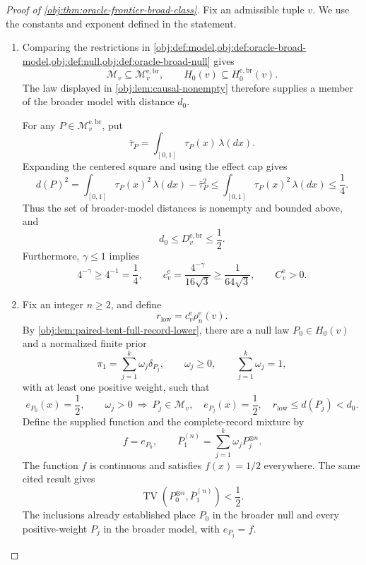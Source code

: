 \documentclass[11pt]{article}
\begin{document}
\begin{proof}[Proof of \cref{obj:thm:oracle-frontier-broad-class}]
Fix an admissible tuple \(v\). We use the constants and exponent defined in the statement.

\begin{enumerate}
\item Comparing the restrictions in
\cref{obj:def:model,obj:def:oracle-broad-model,obj:def:null,obj:def:oracle-broad-null}
gives
\[
\mathcal M_v\subseteq\mathcal M_v^{\mathrm{e,br}},
\qquad
H_0(v)\subseteq H_0^{\mathrm{e,br}}(v).
\]
The law displayed in \cref{obj:lem:causal-nonempty} therefore supplies a member of the broader model with distance \(d_0\).

For any \(P\in\mathcal M_v^{\mathrm{e,br}}\), put
\[
\bar\tau_P=\int_{[0,1]}\tau_P(x)\,\lambda(dx).
\]
Expanding the centered square and using the effect cap gives
\[
d(P)^2
=\int_{[0,1]}\tau_P(x)^2\,\lambda(dx)-\bar\tau_P^2
\le\int_{[0,1]}\tau_P(x)^2\,\lambda(dx)
\le\frac14.
\]
Thus the set of broader-model distances is nonempty and bounded above, and
\[
d_0\le D_v^{\mathrm{e,br}}\le\frac12.
\]
Furthermore, \(\gamma\le1\) implies
\[
4^{-\gamma}\ge4^{-1}=\frac14,
\qquad
c_v^{\mathrm e}
=\frac{4^{-\gamma}}{16\sqrt3}
\ge\frac1{64\sqrt3},
\qquad
C_v^{\mathrm e}>0.
\]

\item Fix an integer \(n\ge2\), and define
\[
r_{\mathrm{low}}=c_v^{\mathrm e}\rho_n^{\mathrm e}(v).
\]
By \cref{obj:lem:paired-tent-full-record-lower}, there are a null law \(P_0\in H_0(v)\) and a normalized finite prior
\[
\pi_1=\sum_{j=1}^k\omega_j\delta_{P_j},
\qquad
\omega_j\ge0,
\qquad
\sum_{j=1}^k\omega_j=1,
\]
with at least one positive weight, such that
\[
e_{P_0}(x)=\frac12,
\qquad
\omega_j>0
\ \Longrightarrow\
P_j\in\mathcal M_v,\quad
e_{P_j}(x)=\frac12,\quad
r_{\mathrm{low}}\le d(P_j)<d_0.
\]
Define the supplied function and the complete-record mixture by
\[
f=e_{P_0},
\qquad
\overline P_1^{(n)}
=\sum_{j=1}^k\omega_jP_j^{\otimes n}.
\]
The function \(f\) is continuous and satisfies \(f(x)=1/2\) everywhere. The same cited result gives
\[
\operatorname{TV}\!\left(P_0^{\otimes n},\overline P_1^{(n)}\right)<\frac12.
\]
The inclusions already established place \(P_0\) in the broader null and every positive-weight \(P_j\) in the broader model, with \(e_{P_j}=f\).


\end{enumerate}
\end{proof}
\end{document}
